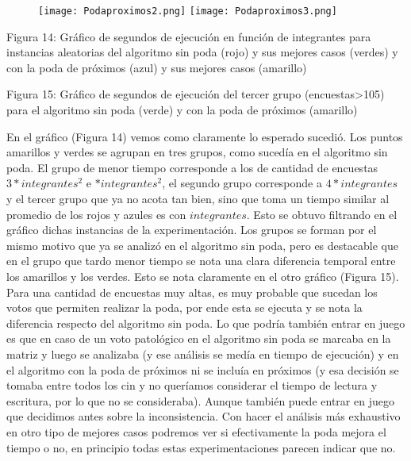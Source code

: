\documentclass[A4paper,oneside,fleqn,10pt]{article}
\theoremstyle{definition}
\begin{document}
\begin{figure}[!ht]
  \texttt{[image: Podaproximos2.png]}
    \label{fig:boat14}
     \texttt{[image: Podaproximos3.png]}
    \label{fig:boat15}
  
\end{figure}

    \scriptsize
    
    Figura 14: Gráfico de segundos de ejecución en función de integrantes para instancias aleatorias del algoritmo sin poda (rojo) y sus mejores casos (verdes) y con la poda de próximos (azul) y sus mejores casos (amarillo)
    
    Figura 15: Gráfico de segundos de ejecución del tercer grupo (encuestas>105) para el algoritmo sin poda (verde) y con la poda de próximos (amarillo)

	\normalsize

En el gráfico (Figura 14) vemos como claramente lo esperado sucedió. Los puntos amarillos y verdes se agrupan en tres grupos, como sucedía en el algoritmo sin poda. El grupo de menor tiempo corresponde a los de cantidad de encuestas $3*integrantes^2$ e $*integrantes^2$, el segundo grupo corresponde a $4*integrantes$ y el tercer grupo que ya no acota tan bien, sino que toma un tiempo similar al promedio de los rojos y azules es con $integrantes$. Esto se obtuvo filtrando en el gráfico dichas instancias de la experimentación. Los grupos se forman por el mismo motivo que ya se analizó en el algoritmo sin poda, pero es destacable que en el grupo que tardo menor tiempo se nota una clara diferencia temporal entre los amarillos y los verdes. Esto se nota claramente en el otro gráfico (Figura 15). Para una cantidad de encuestas muy altas, es muy probable que sucedan los votos que permiten realizar la poda, por ende esta se ejecuta y se nota la diferencia respecto del algoritmo sin poda. Lo que podría también entrar en juego es que en caso de un voto patológico en el algoritmo sin poda se marcaba en la matriz y luego se analizaba (y ese análisis se medía en  tiempo de ejecución) y en el algoritmo con la poda de próximos ni se incluía en próximos (y esa decisión se tomaba entre todos los cin y no queríamos considerar el tiempo de lectura y escritura, por lo que no se consideraba). Aunque también puede entrar en juego que decidimos antes sobre la inconsistencia. Con hacer el análisis más exhaustivo en otro tipo de mejores casos podremos ver si efectivamente la poda mejora el tiempo o no, en principio todas estas experimentaciones parecen indicar que no.
\end{document}
